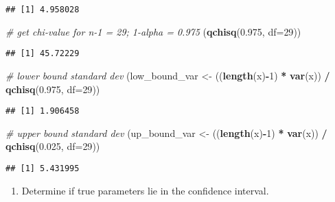 \documentclass[
]{article}
\newenvironment{Shaded}{\begin{snugshade}}{\end{snugshade}}
\newcommand{\CommentTok}[1]{\textcolor[rgb]{0.56,0.35,0.01}{\textit{#1}}}
\newcommand{\DataTypeTok}[1]{\textcolor[rgb]{0.13,0.29,0.53}{#1}}
\newcommand{\DecValTok}[1]{\textcolor[rgb]{0.00,0.00,0.81}{#1}}
\newcommand{\FloatTok}[1]{\textcolor[rgb]{0.00,0.00,0.81}{#1}}
\newcommand{\KeywordTok}[1]{\textcolor[rgb]{0.13,0.29,0.53}{\textbf{#1}}}
\newcommand{\NormalTok}[1]{#1}
\newcommand{\OperatorTok}[1]{\textcolor[rgb]{0.81,0.36,0.00}{\textbf{#1}}}
\newcommand{\StringTok}[1]{\textcolor[rgb]{0.31,0.60,0.02}{#1}}
\providecommand{\tightlist}{%
  \setlength{\itemsep}{0pt}\setlength{\parskip}{0pt}}
\begin{document}
\begin{verbatim}
## [1] 4.958028
\end{verbatim}

\begin{Shaded}
\begin{Highlighting}[]
\CommentTok{# get chi-value for n-1 = 29; 1-alpha = 0.975}
\NormalTok{(}\KeywordTok{qchisq}\NormalTok{(}\FloatTok{0.975}\NormalTok{, }\DataTypeTok{df=}\DecValTok{29}\NormalTok{))}
\end{Highlighting}
\end{Shaded}

\begin{verbatim}
## [1] 45.72229
\end{verbatim}

\begin{Shaded}
\begin{Highlighting}[]
\CommentTok{# lower bound standard dev}
\NormalTok{(low_bound_var <-}\StringTok{ }\NormalTok{((}\KeywordTok{length}\NormalTok{(x)}\OperatorTok{-}\DecValTok{1}\NormalTok{) }\OperatorTok{*}\StringTok{ }\KeywordTok{var}\NormalTok{(x)) }\OperatorTok{/}\StringTok{ }\KeywordTok{qchisq}\NormalTok{(}\FloatTok{0.975}\NormalTok{, }\DataTypeTok{df=}\DecValTok{29}\NormalTok{))}
\end{Highlighting}
\end{Shaded}

\begin{verbatim}
## [1] 1.906458
\end{verbatim}

\begin{Shaded}
\begin{Highlighting}[]
\CommentTok{# upper bound standard dev}
\NormalTok{(up_bound_var <-}\StringTok{ }\NormalTok{((}\KeywordTok{length}\NormalTok{(x)}\OperatorTok{-}\DecValTok{1}\NormalTok{) }\OperatorTok{*}\StringTok{ }\KeywordTok{var}\NormalTok{(x)) }\OperatorTok{/}\StringTok{ }\KeywordTok{qchisq}\NormalTok{(}\FloatTok{0.025}\NormalTok{, }\DataTypeTok{df=}\DecValTok{29}\NormalTok{))}
\end{Highlighting}
\end{Shaded}

\begin{verbatim}
## [1] 5.431995
\end{verbatim}

\begin{enumerate}
\def\labelenumi{\arabic{enumi}.}
\setcounter{enumi}{2}
\tightlist
\item
  Determine if true parameters lie in the confidence interval.
\end{enumerate}
\end{document}
